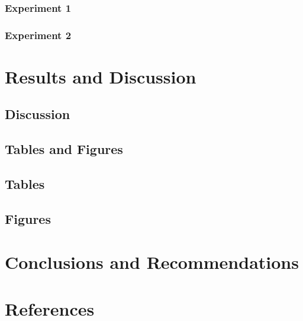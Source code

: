 \documentclass[
  letterpaper,
  DIV=11,
  numbers=noendperiod]{scrartcl}
\begin{document}
\hypertarget{experiment-1}{%
\subsubsection{Experiment 1}\label{experiment-1}}

\hypertarget{experiment-2}{%
\subsubsection{Experiment 2}\label{experiment-2}}

\hypertarget{results-and-discussion}{%
\section{Results and Discussion}\label{results-and-discussion}}

\hypertarget{discussion}{%
\subsection{Discussion}\label{discussion}}

\hypertarget{tables-and-figures}{%
\subsection{Tables and Figures}\label{tables-and-figures}}

\hypertarget{tables}{%
\subsection{Tables}\label{tables}}

\hypertarget{figures}{%
\subsection{Figures}\label{figures}}

\hypertarget{conclusions-and-recommendations}{%
\section{Conclusions and
Recommendations}\label{conclusions-and-recommendations}}

\hypertarget{references}{%
\section{References}\label{references}}
\end{document}
